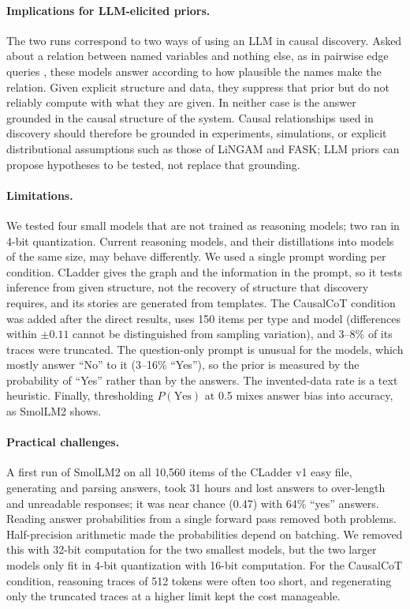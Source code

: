 \documentclass{llncs}
\begin{document}
\paragraph{Implications for LLM-elicited priors.} The two runs correspond to two ways of using an LLM in causal discovery. Asked about a relation between named variables and nothing else, as in pairwise edge queries \cite{kiciman2023causal,long2023can}, these models answer according to how plausible the names make the relation. Given explicit structure and data, they suppress that prior but do not reliably compute with what they are given. In neither case is the answer grounded in the causal structure of the system. Causal relationships used in discovery should therefore be grounded in experiments, simulations, or explicit distributional assumptions such as those of LiNGAM and FASK; LLM priors can propose hypotheses to be tested, not replace that grounding.

\paragraph{Limitations.} We tested four small models that are not trained as reasoning models; two ran in 4-bit quantization. Current reasoning models, and their distillations into models of the same size, may behave differently. We used a single prompt wording per condition. CLadder gives the graph and the information in the prompt, so it tests inference from given structure, not the recovery of structure that discovery requires, and its stories are generated from templates. The CausalCoT condition was added after the direct results, uses 150 items per type and model (differences within $\pm 0.11$ cannot be distinguished from sampling variation), and 3--8\% of its traces were truncated.
The question-only prompt is unusual for the models, which mostly answer ``No'' to it (3--16\% ``Yes''), so the prior is measured by the probability of ``Yes'' rather than by the answers. The invented-data rate is a text heuristic. Finally, thresholding $P(\text{Yes})$ at 0.5 mixes answer bias into accuracy, as SmolLM2 shows.

\paragraph{Practical challenges.} A first run of SmolLM2 on all 10,560 items of the CLadder v1 easy file, generating and parsing answers, took 31 hours and lost answers to over-length and unreadable responses; it was near chance (0.47) with 64\% ``yes'' answers. Reading answer probabilities from a single forward pass removed both problems. Half-precision arithmetic made the probabilities depend on batching. We removed this with 32-bit computation for the two smallest models, but the two larger models only fit in 4-bit quantization with 16-bit computation. For the CausalCoT condition, reasoning traces of 512 tokens were often too short, and regenerating only the truncated traces at a higher limit kept the cost manageable.
\end{document}
